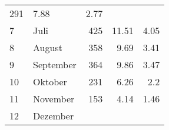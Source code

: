 \begin{longtable}{lXrrr}
       \num{291} &
       \num[round-mode=places,round-precision=2]{7,88} &
         \num[round-mode=places,round-precision=2]{2,77} \\

     7 &
     \multicolumn{1}{X}{ Juli   } &


       \num{425} &
       \num[round-mode=places,round-precision=2]{11,51} &
         \num[round-mode=places,round-precision=2]{4,05} \\

     8 &
     \multicolumn{1}{X}{ August   } &


       \num{358} &
       \num[round-mode=places,round-precision=2]{9,69} &
         \num[round-mode=places,round-precision=2]{3,41} \\

     9 &
     \multicolumn{1}{X}{ September   } &


       \num{364} &
       \num[round-mode=places,round-precision=2]{9,86} &
         \num[round-mode=places,round-precision=2]{3,47} \\

     10 &
     \multicolumn{1}{X}{ Oktober   } &


       \num{231} &
       \num[round-mode=places,round-precision=2]{6,26} &
         \num[round-mode=places,round-precision=2]{2,2} \\

     11 &
     \multicolumn{1}{X}{ November   } &


       \num{153} &
       \num[round-mode=places,round-precision=2]{4,14} &
         \num[round-mode=places,round-precision=2]{1,46} \\

     12 &
     \multicolumn{1}{X}{ Dezember   } &



\end{longtable}
